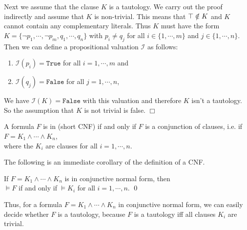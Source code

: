 Next we assume that the clause $K$ is a tautology.  We carry out the proof
indirectly and assume that $K$ is non-trivial.  This means that $\top \notin K$ and
$K$ cannot contain any complementary literals.  Thus $K$ must have the form
\\[0.2cm]
\hspace*{1.3cm} 
$K = \{ \neg p_1, \cdots, \neg p_m, q_1, \cdots, q_n \}$ \quad with $p_i
\not= q_j$ for all $i \in \{ 1,\cdots,m\}$ and $j \in \{1, \cdots, n\}$.
\\[0.2cm]
Then we can define a propositional valuation $\mathcal{I}$ as follows:
\begin{enumerate}
\item $\mathcal{I}(p_i) = \texttt{True}$ for all $i = 1, \cdots, m$ and
\item $\mathcal{I}(q_j) = \texttt{False}$ for all $j = 1, \cdots, n$,
\end{enumerate}
We have $\mathcal{I}(K) = \texttt{False}$ with this valuation and therefore $K$ isn't a tautology.  So the
assumption that $K$ is not trivial is false. 
\hspace*{\fill}  $\Box$

\begin{Definition}  
  A formula $F$ is in  (short CNF)
  if and only if $F$ is a conjunction of clauses, i.e. if \\[0.2cm]
  \hspace*{1.3cm} $F = K_1 \wedge \cdots \wedge K_n$, \\[0.2cm]
  where the $K_i$ are clauses for all $i=1,\cdots,n$. \eox
\end{Definition}

\noindent
The following is an immediate corollary of the definition of a CNF.
\begin{Corollary} \label{corollary:knf}
  If $F = K_1 \wedge \cdots \wedge K_n$ is in conjunctive normal form, then\\[0.2cm]
  \hspace*{1.3cm} $\models F$ \quad if and only if \quad $\models K_i$ \quad for all $i=1,\cdots,n$. \qed
\end{Corollary}

Thus, for a formula $F = K_1 \wedge \cdots \wedge K_n$ in conjunctive normal form, we can easily decide whether
$F$ is a tautology, because $F$ is a tautology iff all clauses $K_i$ are trivial.
\vspace*{0.2cm}

